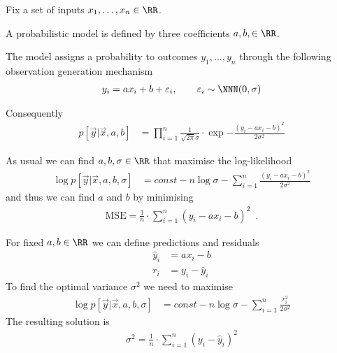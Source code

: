 \documentclass[landscape,footrule]{foils}
\begin{document}

\begin{triangles}
\item Fix a set of inputs $x_1, \ldots, x_n\in \RR$. 
\item A probabilistic model is defined by three coefficients $a, b,\in\RR$.
\item The model assigns a probability to outcomes $y_1,\ldots, y_n$ through the following observation generation mechanism
\begin{align*}
  y_i=ax_i+b+\varepsilon_i,\qquad \varepsilon_i\sim\NNN(0,\sigma)
\end{align*}
\item Consequently 
\begin{align*}
  p[\vec{y}|\vec{x},a,b]&=\prod_{i=1}^n\frac{1}{\sqrt{2\pi}
    \sigma}\cdot\exp{-\frac{(y_i-ax_i-b)^2}{2\sigma^2}}
\end{align*}
\end{triangles}


As usual we can find  $a,b,\sigma\in\RR$ that maximise the log-likelihood
\begin{align*}
\log p[\vec{y}|\vec{x},a,b,\sigma]&= const -n\log \sigma-\sum_{i=1}^n\frac{(y_i-ax_i-b)^2}{2\sigma^2}
\end{align*}
and thus we can find $a$ and $b$ by minimising 
\begin{align*}
\text{MSE}=\frac{1}{n}\cdot \sum_{i=1}^n(y_i-ax_i-b)^2\enspace.
\end{align*}



For fixed $a, b\in\RR$ we can define predictions and residuals 
\begin{align*}
\hat{y}_i&= ax_i-b\\
r_i&=y_i-\hat{y}_i
\end{align*}
To find the optimal variance $\sigma^2$ we need to maximise
\begin{align*}
\log p[\vec{y}|\vec{x},a,b,\sigma]&= const -n\log \sigma-\sum_{i=1}^n\frac{r_i^2}{2\sigma^2}
\end{align*}
The resulting solution is 
\begin{align*}
\sigma^2=\frac{1}{n}\cdot \sum_{i=1}^n (y_i-\hat{y}_i)^2
\end{align*}

\end{document}
